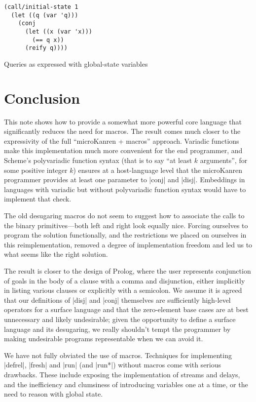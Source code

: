 \documentclass[sigplan,draft,natbib=false]{acmart}
\begin{document}
\begin{listing}
  \begin{verbatim}
(call/initial-state 1
  (let ((q (var 'q)))
    (conj
      (let ((x (var 'x)))
        (== q x))
      (reify q))))
  \end{verbatim}
  \caption{Queries as expressed with global-state variables}
  \label{mnt:run-query}
\end{listing}

\section{Conclusion}\label{sec:conclusion}

This note shows how to provide a somewhat more powerful core language
that significantly reduces the need for macros. The result comes much
closer to the expressivity of the full \enquote{microKanren + macros}
approach. Variadic functions make this implementation much more
convenient for the end programmer, and Scheme's polyvariadic function
syntax (that is to say \enquote{at least $k$ arguments}, for some
positive integer $k$) ensures at a host-language level that the
microKanren programmer provides at least one parameter to
\rackinline|conj| and \rackinline|disj|. Embeddings in languages with
variadic but without polyvariadic function syntax would have to
implement that check.

The old desugaring macros do not seem to suggest how to associate the
calls to the binary primitives---both left and right look equally
nice. Forcing ourselves to program the solution functionally, and the
restrictions we placed on ourselves in this reimplementation, removed
a degree of implementation freedom and led us to what seems like the
right solution.

The result is closer to the design of Prolog, where the user
represents conjunction of goals in the body of a clause with a comma
and disjunction, either implicitly in listing various clauses or
explicitly with a semicolon. We assume it is agreed that our
definitions of \rackinline|disj| and \rackinline|conj| themselves are
sufficiently high-level operators for a surface language and that the
zero-element base cases are at best unnecessary and likely
undesirable; given the opportunity to define a surface language and
its desugaring, we really shouldn't tempt the programmer by making
undesirable programs representable when we can avoid it.

We have not fully obviated the use of macros. Techniques for
implementing \rackinline|defrel|, \rackinline|fresh| and
\rackinline|run| (and \rackinline|run*|) without macros come with
serious drawbacks. These include exposing the implementation of
streams and delays, and the inefficiency and clumsiness of introducing
variables one at a time, or the need to reason with global state.
\end{document}
